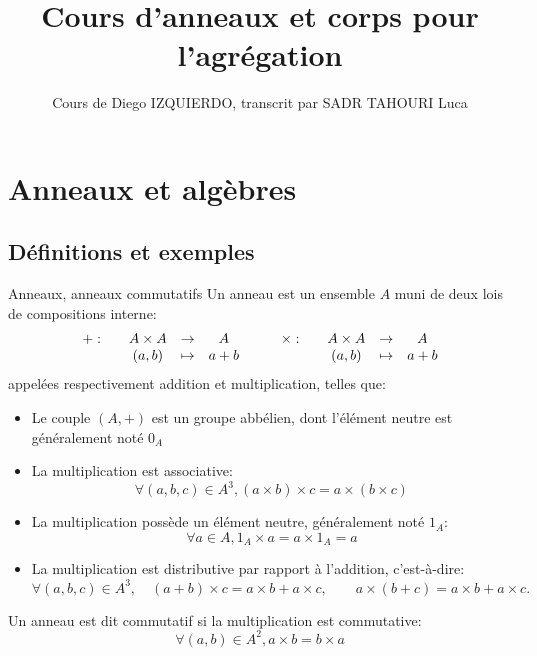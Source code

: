 \documentclass[]{report}
\title{Cours d'anneaux et corps pour l'agrégation}
\author{Cours de Diego IZQUIERDO, transcrit par SADR TAHOURI Luca}
\date{}
\begin{document}
\maketitle
\tableofcontents

\chapter{Anneaux et algèbres}

\section{Définitions et exemples}

\begin{df}{Anneaux, anneaux commutatifs}{}
    Un anneau est un ensemble $A$ muni de deux lois de compositions interne:
    \[\begin{array}{ccccc} + : & & A\times A & \to & A \\ & & (a,b) & \mapsto & a+b \end{array}\qquad \begin{array}{ccccc} \times  : & & A\times A & \to & A \\ & & (a,b) & \mapsto & a+b \end{array}\]
    appelées respectivement addition et multiplication, telles que:
    \begin{itemize}
        \item Le couple $(A,+)$ est un groupe abbélien, dont l'élément neutre est généralement noté $0_A$
        \item La multiplication est associative:
        \[\forall (a,b,c)\in A^3,(a\times b)\times c=a\times (b\times c)\]
        \item La multiplication possède un élément neutre, généralement noté $1_A$:
        \[\forall a\in A, 1_A\times a=a\times 1_A=a\]
        \item La multiplication est distributive par rapport à l'addition, c'est-à-dire:
        \[\forall (a, b, c) \in A^3, \quad (a + b) \times c = a \times b + a \times c, \qquad a \times (b + c) = a \times b + a \times c.\]
    \end{itemize}
    Un anneau est dit commutatif si la multiplication est commutative:
    \[\forall (a,b)\in A^2, a\times b=b\times a\]
\end{df}
\end{document}
